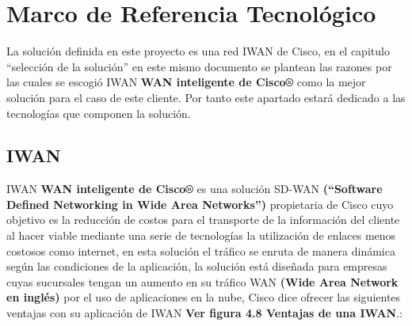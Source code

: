 \section{Marco de Referencia Tecnológico}
\label{sec:Marco de referencia tecnológico}

La solución definida en este proyecto es una red IWAN de Cisco, en el capitulo “selección de la solución” en este mismo documento se plantean las razones por las cuales se escogió IWAN \textbf{WAN inteligente de Cisco®} como la mejor solución para el caso de este cliente. Por tanto este apartado estará dedicado a las tecnologías que componen la solución.


\subsection{IWAN}
\label{sec:IWAN}

IWAN \textbf{WAN inteligente de Cisco®} es una solución SD-WAN \textbf{(“Software Defined Networking in Wide Area Networks”)} propietaria de Cisco cuyo objetivo es la reducción de costos para el transporte de la información del cliente al hacer viable mediante una serie de tecnologías la utilización de enlaces menos costosos como internet, en esta solución el tráfico se enruta de manera dinámica según las condiciones de la aplicación, la solución está diseñada para empresas cuyas sucursales tengan un aumento en su tráfico WAN \textbf{(Wide Area Network en inglés)} por el uso de aplicaciones en la nube, Cisco dice ofrecer las siguientes ventajas con su aplicación de IWAN \textbf{Ver figura 4.8 Ventajas de una IWAN}.:

